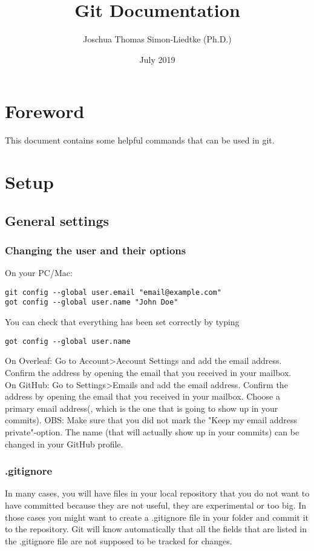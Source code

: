 \documentclass{report}
\title{Git Documentation}
\author{Joschua Thomas Simon-Liedtke (Ph.D.)}
\date{July 2019}
\begin{document}
\maketitle

\chapter*{Foreword}

This document contains some helpful commands that can be used in git.

\tableofcontents

\chapter{Setup}

\section{General settings}

\subsection{Changing the user and their options}

On your PC/Mac:
\begin{verbatim}
git config --global user.email "email@example.com"
got config --global user.name "John Doe"
\end{verbatim}
You can check that everything has been set correctly by typing
\begin{verbatim}
got config --global user.name
\end{verbatim}

On Overleaf:
Go to Account\textgreater  Account Settings and add the email address. Confirm the address by opening the email that you received in your mailbox.
\\

On GitHub:
Go to Settings\textgreater  Emails and add the email address. Confirm the address by opening the email that you received in your mailbox. Choose a primary email address(, which is the one that is going to show up in your commits). OBS: Make sure that you did not mark the "Keep my email address private"-option. The name (that will actually show up in your commits) can be changed in your GitHub profile.

\subsection{.gitignore}
In many cases, you will have files in your local repository that you do not want to have committed because they are not useful, they are experimental or too big. In those cases you might want to create a .gitignore file in your folder and commit it to the repository. Git will know automatically that all the fields that are listed in the .gitignore file are not supposed to be tracked for changes.
\end{document}
